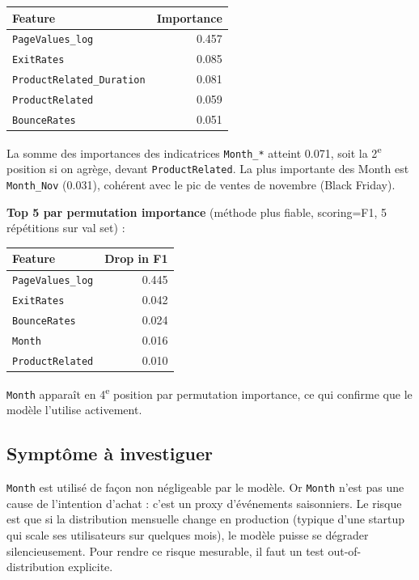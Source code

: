 \documentclass[11pt,a4paper]{article}
\newcommand{\code}[1]{\texttt{\small#1}}
\begin{document}
\begin{center}
\begin{tabular}{lr}
\toprule
\textbf{Feature} & \textbf{Importance} \\
\midrule
\code{PageValues\_log}          & 0.457 \\
\code{ExitRates}                & 0.085 \\
\code{ProductRelated\_Duration} & 0.081 \\
\code{ProductRelated}           & 0.059 \\
\code{BounceRates}              & 0.051 \\
\bottomrule
\end{tabular}
\end{center}

La somme des importances des indicatrices \code{Month\_*} atteint 0.071, soit la 2\textsuperscript{e} position si on agrège, devant \code{ProductRelated}. La plus importante des Month est \code{Month\_Nov} (0.031), cohérent avec le pic de ventes de novembre (Black Friday).

\textbf{Top 5 par permutation importance} (méthode plus fiable, scoring=F1, 5 répétitions sur val set) :

\begin{center}
\begin{tabular}{lr}
\toprule
\textbf{Feature} & \textbf{Drop in F1} \\
\midrule
\code{PageValues\_log} & 0.445 \\
\code{ExitRates}       & 0.042 \\
\code{BounceRates}     & 0.024 \\
\code{Month}           & 0.016 \\
\code{ProductRelated}  & 0.010 \\
\bottomrule
\end{tabular}
\end{center}

\code{Month} apparaît en 4\textsuperscript{e} position par permutation importance, ce qui confirme que le modèle l'utilise activement.

\subsection*{Symptôme à investiguer}

\code{Month} est utilisé de façon non négligeable par le modèle. Or \code{Month} n'est pas une cause de l'intention d'achat : c'est un proxy d'événements saisonniers. Le risque est que si la distribution mensuelle change en production (typique d'une startup qui scale ses utilisateurs sur quelques mois), le modèle puisse se dégrader silencieusement. Pour rendre ce risque mesurable, il faut un test out-of-distribution explicite.
\end{document}
